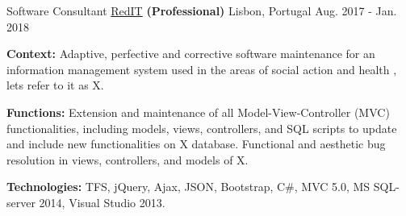 \begin{cventries}
  \cventry
    {Software Consultant} %
    {\href{https://www.reditpro.com/}{RedIT} \textbf{(Professional)}} %
    {Lisbon, Portugal} %
    {Aug. 2017 - Jan. 2018} %
    {
      \begin{cvitems} %
		\item {\textbf{Context:} 
Adaptive, perfective and corrective software maintenance for an information management system used in the areas of social action and health %
, lets refer to it as X.}
		\item {\textbf{Functions:} Extension and maintenance of all Model-View-Controller (MVC) functionalities, including models, views, controllers, and SQL scripts to update and include new functionalities on X database. Functional and aesthetic bug resolution in views, controllers, and models of X.}		
		\item {\textbf{Technologies:} TFS, jQuery, Ajax, JSON, Bootstrap, C\#, MVC 5.0, MS SQL-server 2014, Visual Studio 2013.}
      \end{cvitems}
    } 
    

\end{cventries}
